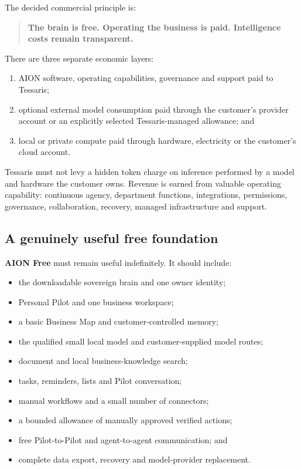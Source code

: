 The decided commercial principle is:

\begin{quote}
\textbf{The brain is free. Operating the business is paid. Intelligence costs remain transparent.}
\end{quote}

There are three separate economic layers:

\begin{enumerate}
  \item AION software, operating capabilities, governance and support paid to Tessaris;
  \item optional external model consumption paid through the customer's provider account or an
        explicitly selected Tessaris-managed allowance; and
  \item local or private compute paid through hardware, electricity or the customer's cloud
        account.
\end{enumerate}

Tessaris must not levy a hidden token charge on inference performed by a model and hardware the
customer owns. Revenue is earned from valuable operating capability: continuous agency,
department functions, integrations, permissions, governance, collaboration, recovery, managed
infrastructure and support.

\subsection{A genuinely useful free foundation}

\textbf{AION Free} must remain useful indefinitely. It should include:

\begin{itemize}
  \item the downloadable sovereign brain and one owner identity;
  \item Personal Pilot and one business workspace;
  \item a basic Business Map and customer-controlled memory;
  \item the qualified small local model and customer-supplied model routes;
  \item document and local business-knowledge search;
  \item tasks, reminders, lists and Pilot conversation;
  \item manual workflows and a small number of connectors;
  \item a bounded allowance of manually approved verified actions;
  \item free Pilot-to-Pilot and agent-to-agent communication; and
  \item complete data export, recovery and model-provider replacement.
\end{itemize}

